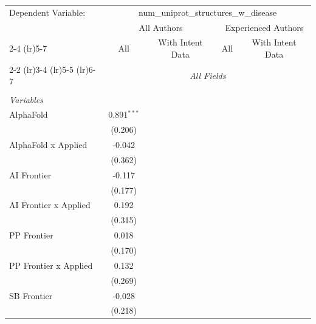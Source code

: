 \begingroup
\centering
\begin{tabular}{lcccccc}
   \tabularnewline \midrule \midrule
   Dependent Variable: & \multicolumn{6}{c}{num\_uniprot\_structures\_w\_disease}\\
 & \multicolumn{3}{c}{All Authors} & \multicolumn{3}{c}{Experienced Authors} \\
\cmidrule(lr){2-4} \cmidrule(lr){5-7}
 & \multicolumn{1}{c}{All} & \multicolumn{2}{c}{With Intent Data} & \multicolumn{1}{c}{All} & \multicolumn{2}{c}{With Intent Data} \\
\cmidrule(lr){2-2} \cmidrule(lr){3-4} \cmidrule(lr){5-5} \cmidrule(lr){6-7}
 & \multicolumn{6}{c}{\textit{All Fields}} \\ \\
   \emph{Variables}\\
   AlphaFold             & 0.891$^{***}$ &           &           &        &        &   \\   
                         & (0.206)       &           &           &        &        &   \\   
   AlphaFold x Applied   & -0.042        &           &           &        &        &   \\   
                         & (0.362)       &           &           &        &        &   \\   
   AI Frontier           & -0.117        &           &           &        &        &   \\   
                         & (0.177)       &           &           &        &        &   \\   
   AI Frontier x Applied & 0.192         &           &           &        &        &   \\   
                         & (0.315)       &           &           &        &        &   \\   
   PP Frontier           & 0.018         &           &           &        &        &   \\   
                         & (0.170)       &           &           &        &        &   \\   
   PP Frontier x Applied & 0.132         &           &           &        &        &   \\   
                         & (0.269)       &           &           &        &        &   \\   
   SB Frontier           & -0.028        &           &           &        &        &   \\   
                         & (0.218)       &           &           &        &        &   \\   

\end{tabular}
